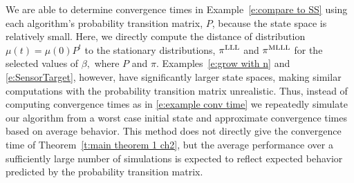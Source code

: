 We are able to determine convergence times in Example~\ref{e:compare to SS} using each algorithm's probability transition matrix, $P$, because the state space is relatively small. Here, we directly compute the distance of distribution $\mu(t) = \mu(0)P^t$ to the stationary distributions, $\pi^{\rm LLL}$ and $\pi^{\rm MLLL}$ for the selected values of $\beta,$ where $P$ and $\pi$.  
Examples~\ref{e:grow with n} and \ref{e:SensorTarget}, however, have significantly larger state spaces, making similar computations with the probability transition matrix unrealistic. Thus, instead of computing convergence times as in \eqref{e:example conv time} we repeatedly simulate our algorithm from a worst case initial state and approximate convergence times based on average behavior. This method does not directly give the convergence time of Theorem~\ref{t:main theorem 1 ch2}, but the average performance over a sufficiently large number of simulations is expected to reflect expected behavior predicted by the probability transition matrix.


